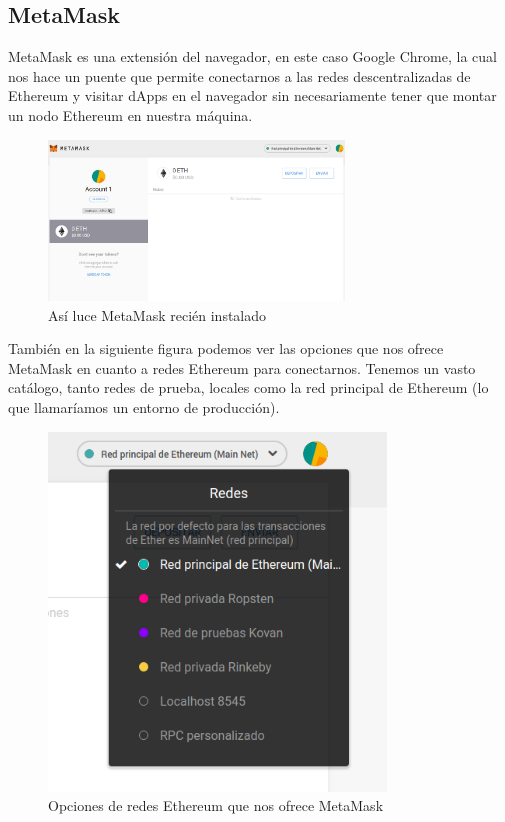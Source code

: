 \subsection{MetaMask}
MetaMask es una extensión del navegador, en este caso Google Chrome, la cual nos hace un puente
que permite conectarnos a las redes descentralizadas de Ethereum y visitar dApps en el navegador
sin necesariamente tener que montar un nodo Ethereum en nuestra máquina.

\begin{figure}[htbp!] 
\centering    
\includegraphics[width=0.7\textwidth]{metamask-main}
\caption[MetaMaskMain]{Así luce MetaMask recién instalado}
\label{fig:metamask-main}
\end{figure}

También en la siguiente figura podemos ver las opciones que nos ofrece MetaMask en cuanto 
a redes Ethereum para conectarnos. Tenemos un vasto catálogo, tanto redes de prueba, locales
como la red principal de Ethereum (lo que llamaríamos un entorno de producción).

\begin{figure}[htbp!] 
\centering    
\includegraphics[width=0.8\textwidth]{metamask-networks}
\caption[MetaMaskNetworks]{Opciones de redes Ethereum que nos ofrece MetaMask}
\label{fig:metamask-networks}
\end{figure}

